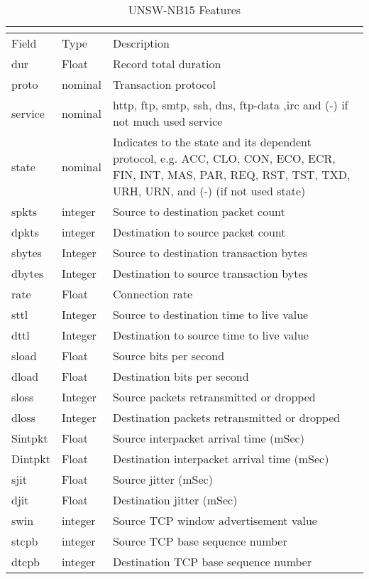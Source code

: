 \begin{longtable}{@{}p{}p{}p{}@{}}
\caption{UNSW-NB15 Features}\\
\label{unswfieldstable}\\
\toprule
Field & Type & Description \\ \midrule
dur & Float & Record total duration \\
proto & nominal & Transaction protocol \\
service & nominal & http, ftp, smtp, ssh, dns, ftp-data ,irc  and (-) if not much used service \\
state & nominal & Indicates to the state and its dependent protocol, e.g. ACC, CLO, CON, ECO, ECR, FIN, INT, MAS, PAR, REQ, RST, TST, TXD, URH, URN, and (-) (if not used state) \\
spkts & integer & Source to destination packet count \\
dpkts & integer & Destination to source packet count \\
sbytes & Integer & Source to destination transaction bytes \\
dbytes & Integer & Destination to source transaction bytes \\
rate & Float & Connection rate \\
sttl & Integer & Source to destination time to live value \\
dttl & Integer & Destination to source time to live value \\
sload & Float & Source bits per second \\
dload & Float & Destination bits per second \\
sloss & Integer & Source packets retransmitted or dropped \\
dloss & Integer & Destination packets retransmitted or dropped \\
Sintpkt & Float & Source interpacket arrival time (mSec) \\
Dintpkt & Float & Destination interpacket arrival time (mSec) \\
sjit & Float & Source jitter (mSec) \\
djit & Float & Destination jitter (mSec) \\
swin & integer & Source TCP window advertisement value \\
stcpb & integer & Source TCP base sequence number \\
dtcpb & integer & Destination TCP base sequence number \\

\end{longtable}
